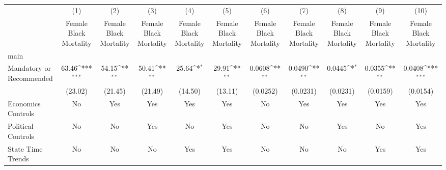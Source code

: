 {
\def\sym#1{\ifmmode^{#1}\else\(^{#1}\)\fi}
\begin{longtable}{l*{10}{c}}
\hline\hline\endfirsthead\hline\endhead\hline\endfoot\endlastfoot
                    &\multicolumn{1}{c}{(1)}&\multicolumn{1}{c}{(2)}&\multicolumn{1}{c}{(3)}&\multicolumn{1}{c}{(4)}&\multicolumn{1}{c}{(5)}&\multicolumn{1}{c}{(6)}&\multicolumn{1}{c}{(7)}&\multicolumn{1}{c}{(8)}&\multicolumn{1}{c}{(9)}&\multicolumn{1}{c}{(10)}\\
                    &\multicolumn{1}{c}{Female Black Mortality}&\multicolumn{1}{c}{Female Black Mortality}&\multicolumn{1}{c}{Female Black Mortality}&\multicolumn{1}{c}{Female Black Mortality}&\multicolumn{1}{c}{Female Black Mortality}&\multicolumn{1}{c}{Female Black Mortality}&\multicolumn{1}{c}{Female Black Mortality}&\multicolumn{1}{c}{Female Black Mortality}&\multicolumn{1}{c}{Female Black Mortality}&\multicolumn{1}{c}{Female Black Mortality}\\
\hline
main                &                     &                     &                     &                     &                     &                     &                     &                     &                     &                     \\
Mandatory or Recommended&       63.46\sym{***}&       54.15\sym{**} &       50.41\sym{**} &       25.64\sym{*}  &       29.91\sym{**} &      0.0608\sym{**} &      0.0490\sym{**} &      0.0445\sym{*}  &      0.0355\sym{**} &      0.0408\sym{***}\\
                    &     (23.02)         &     (21.45)         &     (21.49)         &     (14.50)         &     (13.11)         &    (0.0252)         &    (0.0231)         &    (0.0231)         &    (0.0159)         &    (0.0154)         \\
[1em]
Economics Controls  &          No         &         Yes         &         Yes         &         Yes         &         Yes         &          No         &         Yes         &         Yes         &         Yes         &         Yes         \\
[1em]
Political Controls  &          No         &          No         &         Yes         &          No         &         Yes         &          No         &          No         &         Yes         &          No         &         Yes         \\
[1em]
State Time Trends   &          No         &          No         &          No         &         Yes         &         Yes         &          No         &          No         &          No         &         Yes         &         Yes         \\

\end{longtable}}
